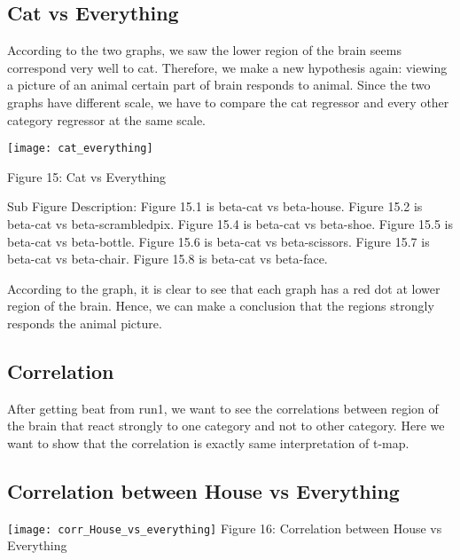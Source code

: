 \documentclass[12pt]{article}
\begin{document}
\subsection{Cat vs Everything}

According to the two graphs, we saw the lower region of the brain seems correspond very well to cat. Therefore, we make a new hypothesis again:  viewing a picture of an animal certain part of brain responds to animal. Since the two graphs have different scale, we have to compare the cat regressor and every other category regressor at the same scale.

    \centering
      \texttt{[image: cat\_everything]}

       
        Figure 15: Cat vs Everything
        

Sub Figure Description:
\newline
Figure 15.1 is beta-cat vs beta-house.
\newline
    Figure 15.2 is beta-cat vs beta-scrambledpix.
\newline
Figure 15.4 is beta-cat vs beta-shoe. 
\newline
Figure 15.5 is beta-cat vs beta-bottle. 
\newline
Figure 15.6 is beta-cat vs beta-scissors. 
\newline
Figure 15.7 is beta-cat vs beta-chair. 
\newline
Figure 15.8 is beta-cat vs beta-face. 
\newline


According to the graph, it is clear to see that each graph has a red dot at lower region of the brain. Hence, we can make a conclusion that the regions strongly responds the animal picture.

\subsection{Correlation}

After getting beat from run1, we want to see the correlations between  region of the brain that react strongly to one category and not to other category. Here we want to show that the correlation is exactly same interpretation  of t-map.


\subsection{Correlation between House vs Everything}

    \centering
      \texttt{[image: corr\_House\_vs\_everything]}
Figure 16: Correlation between House vs Everything
\end{document}
